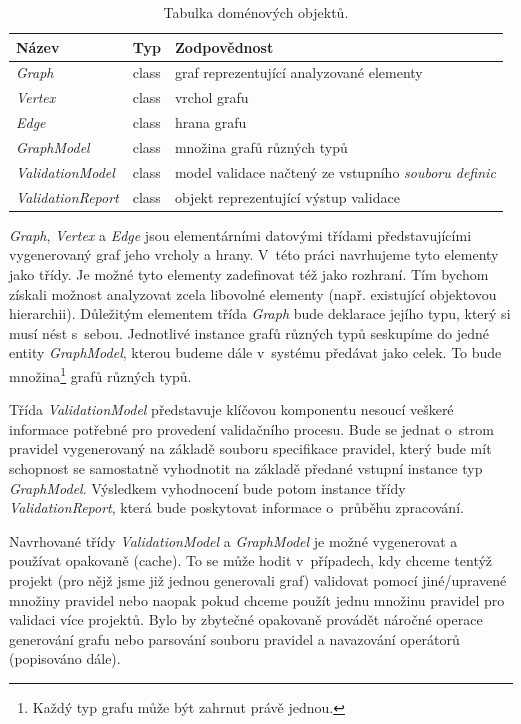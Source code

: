 \begin{table}[h]
  \caption{Tabulka doménových objektů. \label{design-domain_object_table}}
  \begin{center}
    \begin{tabular}{| l | c | p{8cm} |}
      \hline
      \textbf{Název} & \textbf{Typ} & \textbf{Zodpovědnost} \\
      \hline
      \hline
      \emph{Graph} & class & graf reprezentující analyzované elementy \\ \hline
      \emph{Vertex} & class &  vrchol grafu \\ \hline
      \emph{Edge} & class & hrana grafu \\ \hline
      \emph{GraphModel} & class & množina grafů různých typů \\ \hline
      \hline
      \emph{ValidationModel} & class & model validace načtený ze vstupního \emph{souboru definic} \\ \hline
      \hline
      \emph{ValidationReport} & class &  objekt reprezentující výstup validace\\ \hline
    \end{tabular}
  \end{center}

\end{table}

\emph{Graph}, \emph{Vertex} a \emph{Edge} jsou elementárními datovými třídami představujícími vygenerovaný graf jeho vrcholy a hrany. V~této práci navrhujeme tyto elementy jako třídy. Je možné tyto elementy zadefinovat též jako rozhraní. Tím  bychom získali možnost analyzovat zcela libovolné elementy (např. existující objektovou hierarchii). Důležitým elementem třída \emph{Graph} bude deklarace jejího typu, který si musí nést s~sebou. Jednotlivé instance grafů různých typů seskupíme do jedné entity \emph{GraphModel}, kterou budeme dále v~systému předávat jako celek. To bude množina\footnote{Každý typ grafu může být zahrnut právě jednou.} grafů různých typů.

Třída \emph{ValidationModel} představuje klíčovou komponentu nesoucí veškeré informace potřebné pro provedení validačního procesu. Bude se jednat o~strom pravidel vygenerovaný na základě souboru specifikace pravidel, který bude mít schopnost se samostatně vyhodnotit na základě předané vstupní instance typ \emph{GraphModel}. Výsledkem vyhodnocení bude potom instance třídy \emph{ValidationReport}, která bude poskytovat informace o~průběhu zpracování.

Navrhované třídy \emph{ValidationModel} a \emph{GraphModel} je možné vygenerovat a používat opakovaně (cache). To se může hodit v~případech, kdy chceme tentýž projekt (pro nějž jsme již jednou generovali graf) validovat pomocí jiné/upravené množiny pravidel nebo naopak pokud chceme použít jednu množinu pravidel pro validaci více projektů. Bylo by zbytečné opakovaně provádět náročné operace generování grafu nebo parsování souboru pravidel a navazování operátorů (popisováno dále).

